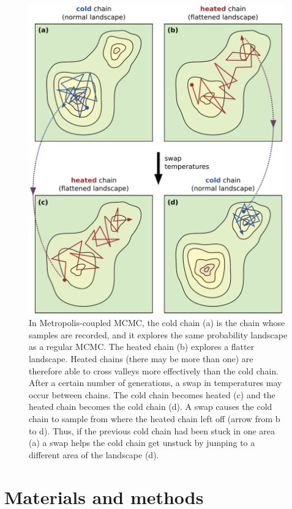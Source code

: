 \documentclass[12pt]{article}
\begin{document}
\begin{figure}
\begin{center}
\includegraphics[width=11cm]{mc3-swap.pdf}
\end{center}
\caption{In Metropolis-coupled MCMC, the cold chain (a)
    is the chain whose samples are recorded, and it explores
    the same probability landscape as a regular MCMC.
    The heated chain (b) explores a flatter landscape.
    Heated chains (there may be more than one) are therefore
    able to cross valleys more effectively than the cold chain.
    After a certain number of generations,
    a swap in temperatures may occur between chains.
    The cold chain becomes heated (c) and the heated chain
    becomes the cold chain (d).
    A swap causes the cold chain to sample from
    where the heated chain left off (arrow from b to d).
    Thus, if the previous cold chain had been stuck in one area (a)
    a swap helps the cold chain get unstuck by jumping
    to a different area of the landscape (d).}
\label{fig:mc3-swap}
\end{figure}


\section*{Materials and methods}
\end{document}
